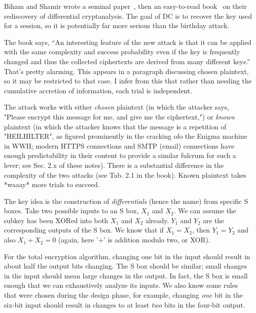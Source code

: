 Biham and Shamir wrote a seminal paper~\cite{biham1991differential},
then an easy-to-read book~\cite{biham1993differential-book} on their
rediscovery of differential cryptanalysis.  The goal of DC is to
recover the key used for a session, so it is potentially far more
serious than the birthday attack.

The book says, ``An interesting feature of the new attack is that it
can be applied with the same complexity and success probability even
if the key is frequently changed and thus the collected ciphertexts
are derived from many different keys.''  \aono{} That's pretty alarming.  This
appears in a paragraph discussing chosen plaintext, so it may be
restricted to that case.  I infer from this that rather than needing
the cumulative accretion of information, each trial is independent.

The attack works with either \emph{chosen} plaintext (in which the attacker
says, "Please encrypt this message for me, and give me the
ciphertext,") or \emph{known} plaintext (in which the attacker knows that
the message is a repetition of "HEILHILTER", as figured prominently in
the cracking ofo the Enigma machine in WWII; modern HTTPS connections and
SMTP (email) connections have enough predictability in their content
to provide a similar fulcrum for such a lever; see Sec. 2.x of these
notes).  There is a substantial difference in the complexity of the
two attacks (see Tab. 2.1 in the book).  Known plaintext takes *waaay*
more trials to succeed.  


The key idea is the construction of \emph{differentials} (hence the name)
from specific S boxes.  Take two possible inputs to an S box, $X_1$
and $X_2$.  We can assume the subkey has been XORed into both $X_1$
and $X_2$ already.  $Y_1$ and $Y_2$ are the corresponding outputs of the
S box.  We know that if $X_1 = X_2$, then $Y_1 = Y_2$ and also $X_1 +
X_2 = 0$ (again, here '+' is addition modulo two, or XOR).

For the total encryption algorithm, changing one bit in the input
should result in about half the output bits changing.  The S box
should be similar; small changes in the input should mean large
changes in the output.  In fact, the S box is small enough that we can
exhaustively analyze its inputs.  We also know some rules that were
chosen during the design phase, for example, changing \emph{one} bit
in the six-bit input should result in changes to at least \emph{two}
bits in the four-bit output.

